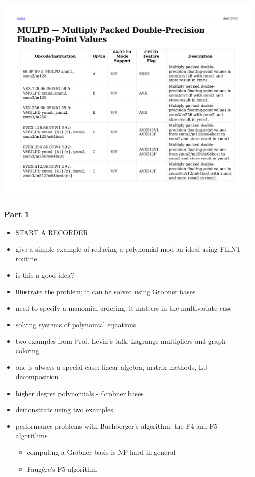 \documentclass{beamer}
\begin{document}
\begin{frame}[fragile]
\includegraphics[page=3, clip, trim=0in 2.6in 0in 4.2in, width=\textwidth]{mulpd.pdf}
\end{frame}

\begin{frame}
\frametitle{Part 1}
\begin{itemize}
\item START A RECORDER
\item give a simple example of reducing a polynomial mod an ideal using FLINT routine
\item is this a good idea?
\item illustrate the problem; it can be solved using Grobner bases
\item need to specify a monomial ordering: it matters in the multivariate case

\item solving systems of polynomial equations
\item two examples from Prof. Levin's talk: Lagrange multipliers and graph coloring
\item one is always a special case: linear algebra, matrix methods, LU decomposition
\item higher degree polynomials - Gr\"obner bases
\item demonstrate using two examples

\item performance problems with Buchberger's algorithm: the F4 and F5 algorithms
\begin{itemize}
   \item computing a Gr\"obner basis is NP-hard in general
   \item Faug\'ere's F5 algorithm
\end{itemize}
\end{itemize}
\end{frame}
\end{document}
